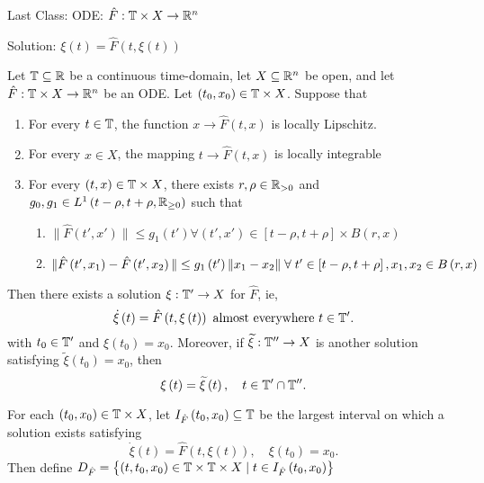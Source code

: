 
Last Class: ODE: $\hat{F} : \mathbb{T} \times X \to \mathbb{R}^{n}$

Solution: $\xi \left( t \right)  = \hat{F}\left( t, \xi \left( t \right)  \right) $

\begin{theorem}
	Let $\mathbb{T} \subseteq \mathbb{R}$ be a continuous time-domain, let  $X \subseteq \mathbb{R}^{n}$ be open, and let $\hat{F} : \mathbb{T}\times X \to \mathbb{R}^{n}$ be an ODE. Let $\left( t_0, x_0 \right) \in  \mathbb{T} \times  X$. Suppose that
	\begin{enumerate}
		\item For every $t \in  \mathbb{T}$, the function $x \to \hat{F}\left( t, x \right)  $ is locally Lipschitz. 
		\item For every $x \in  X $, the mapping $t \to \hat{F}\left( t,x \right) $ is locally integrable
		\item For every $\left( t, x  \right) \in  \mathbb{T} \times  X$, there exists $r, \rho \in \mathbb{R}_{>0}$ and $g_0, g_1 \in \\ L^{1}\left( t - \rho, t + \rho, \mathbb{R} _{\ge 0} \right) $ such that 
			\begin{enumerate}
				\item $\|\hat{F}\left( t', x' \right) \| \le g_{1 }\left( t' \right) \forall \left( t', x' \right) \in \left[ t - \rho, t + \rho \right] \times B\left( r, x \right) $ 
				\item $\|\hat{F}\left( t', x_1  \right) - \hat{F}\left( t', x_2 \right) \| \le g_{1}\left( t' \right)  \|x_1 - x_2\| \forall  t' \in \left[ t - \rho, t + \rho \right] , \\ x_1, x_2 \in  B\left( r, x \right) $
			\end{enumerate}
	\end{enumerate}

	Then there exists a solution $\xi  : \mathbb{T}' \to X$ for $\hat{F}$, ie, 
	\[
		\dot{\xi } \left( t \right)  = \hat{F}\left( t, \xi \left( t \right)  \right)  \text{ almost everywhere } t \in  \mathbb{T}'
	.\] 
	with $t_{0}\in \mathbb{T}'$ and $\xi \left( t_0 \right)  = x_0$. Moreover, if $\widetilde{\xi }  : \mathbb{T}'' \to X$ is another solution satisfying $\widetilde{\xi }\left( t_0 \right)  = x_0$, then 
	\[
		\xi \left( t \right)  = \widetilde{\xi }\left( t \right) , \quad t \in  \mathbb{T}' \cap  \mathbb{T}''	.\] 
\end{theorem}

For each $\left( t_0, x_0 \right) \in  \mathbb{T} \times  X$, let $I  _{\hat{F}}\left( t_0, x_0 \right) \subseteq \mathbb{T}$ be the largest interval on which a solution exists satisfying 
		\[
			\dot{\xi }\left( t \right)  = \hat{F}\left( t, \xi \left( t \right)  \right) , \quad \xi \left( t_0 \right)  = x_0
		.\] 
		Then define $D_{\hat{F}} = \left\{ \left( t, t_0, x_0 \right)  \in \mathbb{T}\times \mathbb{T}\times X  \mid t \in  I_{\hat{F}}\left( t_0, x_0 \right)  \right\} $

